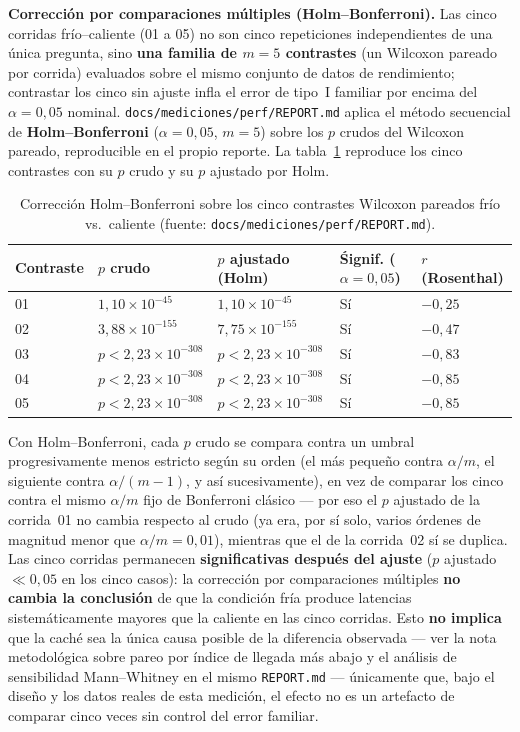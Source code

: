 \textbf{Correcci\'on por comparaciones m\'ultiples (Holm--Bonferroni).}
Las cinco corridas fr\'io--caliente (01 a 05) no son cinco repeticiones
independientes de una \'unica pregunta, sino \textbf{una familia de $m=5$
contrastes} (un Wilcoxon pareado por corrida) evaluados sobre el mismo
conjunto de datos de rendimiento; contrastar los cinco sin ajuste
infla el error de tipo~I familiar por encima del $\alpha=0{,}05$ nominal.
\texttt{docs/mediciones/perf/REPORT.md} aplica el m\'etodo secuencial de
\textbf{Holm--Bonferroni} ($\alpha=0{,}05$, $m=5$) sobre los $p$ crudos del
Wilcoxon pareado, reproducible en el propio reporte. La
tabla~\ref{tab:holm-bonferroni-k6} reproduce los cinco contrastes con su
$p$ crudo y su $p$ ajustado por Holm.

\begin{table}[H]
  \centering
  \small
  \caption{Correcci\'on Holm--Bonferroni sobre los cinco contrastes Wilcoxon pareados fr\'io vs.\ caliente (fuente: \texttt{docs/mediciones/perf/REPORT.md}).}
  \label{tab:holm-bonferroni-k6}
  \begin{tabular}{@{}lllll@{}}
    \toprule
    Contraste & $p$ crudo & $p$ ajustado (Holm) & \'Signif. ($\alpha=0{,}05$) & $r$ (Rosenthal) \\
    \midrule
    01 & $1{,}10\times10^{-45}$ & $1{,}10\times10^{-45}$ & S\'i & $-0{,}25$ \\
    02 & $3{,}88\times10^{-155}$ & $7{,}75\times10^{-155}$ & S\'i & $-0{,}47$ \\
    03 & $p<2{,}23\times10^{-308}$ & $p<2{,}23\times10^{-308}$ & S\'i & $-0{,}83$ \\
    04 & $p<2{,}23\times10^{-308}$ & $p<2{,}23\times10^{-308}$ & S\'i & $-0{,}85$ \\
    05 & $p<2{,}23\times10^{-308}$ & $p<2{,}23\times10^{-308}$ & S\'i & $-0{,}85$ \\
    \bottomrule
  \end{tabular}
\end{table}

Con Holm--Bonferroni, cada $p$ crudo se compara contra un umbral
progresivamente menos estricto seg\'un su orden (el m\'as peque\~no contra
$\alpha/m$, el siguiente contra $\alpha/(m-1)$, y as\'i sucesivamente),
en vez de comparar los cinco contra el mismo $\alpha/m$ fijo de Bonferroni
cl\'asico --- por eso el $p$ ajustado de la corrida~01 no cambia
respecto al crudo (ya era, por s\'i solo, varios \'ordenes de magnitud
menor que $\alpha/m=0{,}01$), mientras que el de la corrida~02 s\'i se
duplica. Las cinco corridas permanecen \textbf{significativas despu\'es
del ajuste} ($p$ ajustado $\ll 0{,}05$ en los cinco casos): la
correcci\'on por comparaciones m\'ultiples \textbf{no cambia la
conclusi\'on} de que la condici\'on fr\'ia produce latencias
sistem\'aticamente mayores que la caliente en las cinco corridas. Esto
\textbf{no implica} que la cach\'e sea la \'unica causa posible de la
diferencia observada --- ver la nota metodol\'ogica sobre pareo por
\'indice de llegada m\'as abajo y el an\'alisis de sensibilidad Mann--Whitney
en el mismo \texttt{REPORT.md} --- \'unicamente que, bajo el dise\~no y los
datos reales de esta medici\'on, el efecto no es un artefacto de comparar
cinco veces sin control del error familiar.

